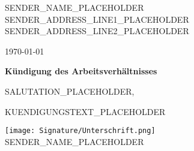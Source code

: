 \documentclass[a4paper,12pt]{article}
\begin{document}
\vspace*{-1cm}
\noindent
SENDER_NAME_PLACEHOLDER \\
SENDER_ADDRESS_LINE1_PLACEHOLDER \\
SENDER_ADDRESS_LINE2_PLACEHOLDER

\vspace{1cm}

\hfill \today

\vspace{2cm}

\textbf{Kündigung des Arbeitsverhältnisses}

\vspace{1cm}

SALUTATION_PLACEHOLDER,

\vspace{0.5cm}
KUENDIGUNGSTEXT_PLACEHOLDER

\vspace{1.5cm}

\vspace*{-0.5cm}\hspace*{0.0cm}\texttt{[image: Signature/Unterschrift.png]}\vspace*{-0.3cm}\\
SENDER_NAME_PLACEHOLDER
\end{document}
